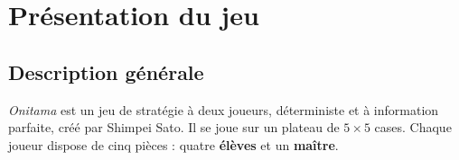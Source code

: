 \documentclass[12pt, a4paper]{article}
\begin{document}
\section{Présentation du jeu}
\label{sec:jeu}

\subsection{Description générale}

\textit{Onitama} est un jeu de stratégie à deux joueurs, déterministe et à information parfaite,
créé par Shimpei Sato. Il se joue sur un plateau de $5 \times 5$ cases. Chaque joueur dispose
de cinq pièces : quatre \textbf{élèves} et un \textbf{maître}.
\end{document}
